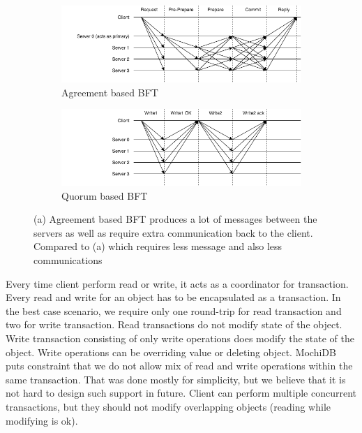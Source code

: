 \documentclass[letterpaper,twocolumn,10pt]{article}
\begin{document}
\begin{figure}
\centering
\begin{subfigure}[b]{0.45\textwidth}
   \includegraphics[width=1\linewidth]{Communication_agreement.png}
   \caption{Agreement based BFT}
   \label{fig:Ng1} 
\end{subfigure}

\begin{subfigure}[b]{0.45\textwidth}
   \includegraphics[width=1\linewidth]{Communication_quorum.png}
   \caption{Quorum based BFT}
   \label{fig:Ng2}
\end{subfigure}

\caption[Two numerical solutions]{(a) Agreement based BFT produces a lot of messages between the servers as well as require extra communication back to the client. Compared to (a) which requires less message and also less communications}
\end{figure}

Every time client perform read or write, it acts as a coordinator for transaction. Every read and write for an object has to be encapsulated as a transaction. In the best case scenario, we require only one round-trip for read transaction and two for write transaction. Read transactions do not modify state of the object. Write transaction consisting of only write operations does modify the state of the object. Write operations can be overriding value or deleting object. MochiDB puts constraint that we do not allow mix of read and write operations within the same transaction. That was done mostly for simplicity, but we believe that it is not hard to design such support in future. Client can perform multiple concurrent transactions, but they should not modify overlapping objects (reading while modifying is ok).
\end{document}
